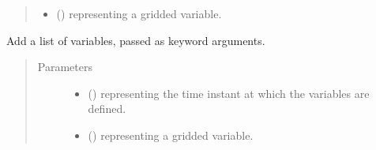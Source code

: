 \documentclass[letterpaper,10pt,english]{sphinxmanual}
\begin{document}
\begin{fulllineitems}
\begin{fulllineitems}
\begin{quote}
\begin{description}
\begin{itemize}
\item {} 
 () \textendash{}  representing a gridded variable.

\end{itemize}

\end{description}\end{quote}

\end{fulllineitems}


\begin{fulllineitems}
\label{\detokenize{api:storages.grid_data.GridData.add_variables}}
Add a list of variables, passed as keyword arguments.
\begin{quote}\begin{description}
\item[{Parameters}] \leavevmode\begin{itemize}
\item {} 
 () \textendash{}  representing the time instant at which the variables are defined.

\item {} 
 () \textendash{}  representing a gridded variable.

\end{itemize}

\end{description}\end{quote}

\end{fulllineitems}



\end{fulllineitems}
\end{document}
